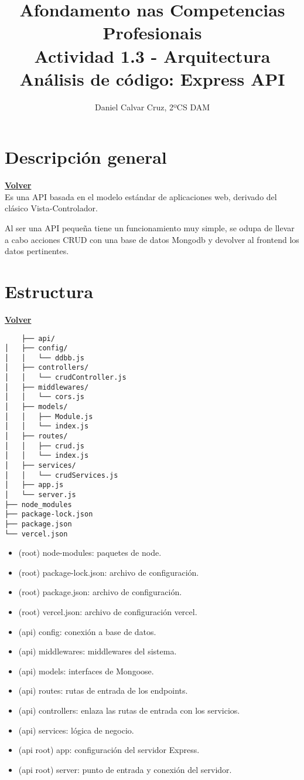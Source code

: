\documentclass[a4paper,12pt]{article}
\title{\textbf{Afondamento nas Competencias Profesionais}\\[1em]\textbf{Actividad 1.3 - Arquitectura}\\[1em]Análisis de código: Express API}
\author{Daniel Calvar Cruz, 2ºCS DAM}
\date{}
\begin{document}
\maketitle
\clearpage
\hypertarget{anchor-indice}{}
\tableofcontents
\newpage

\section{Descripción general}
\hyperlink{anchor-indice}{\textbf{Volver}}\\

Es una API basada en el modelo estándar de aplicaciones web, derivado del clásico Vista-Controlador.

Al ser una API pequeña tiene un funcionamiento muy simple, se odupa de llevar a cabo acciones CRUD con una base de datos Mongodb y devolver al frontend los datos pertinentes.


\section{Estructura}
\hyperlink{anchor-indice}{\textbf{Volver}}\\

\begin{verbatim}
    ├── api/
│   ├── config/
│   │   └── ddbb.js
│   ├── controllers/
│   │   └── crudController.js
│   ├── middlewares/
│   │   └── cors.js
│   ├── models/
│   │   ├── Module.js
│   │   └── index.js
│   ├── routes/
│   │   ├── crud.js
│   │   └── index.js
│   ├── services/
│   │   └── crudServices.js
│   ├── app.js
│   └── server.js
├── node_modules
├── package-lock.json
├── package.json
└── vercel.json
\end{verbatim}

\begin{itemize}
    \item (root) node-modules: paquetes de node.
    \item (root) package-lock.json: archivo de configuración.
    \item (root) package.json: archivo de configuración.
    \item (root) vercel.json: archivo de configuración vercel.
    \item (api) config: conexión a base de datos.
    \item (api) middlewares: middlewares del sistema.
    \item (api) models: interfaces de Mongoose.
    \item (api) routes: rutas de entrada de los endpoints.
    \item (api) controllers: enlaza las rutas de entrada con los servicios.
    \item (api) services: lógica de negocio.
    \item (api root) app: configuración del servidor Express.
    \item (api root) server: punto de entrada y conexión del servidor.
\end{itemize}
\end{document}
